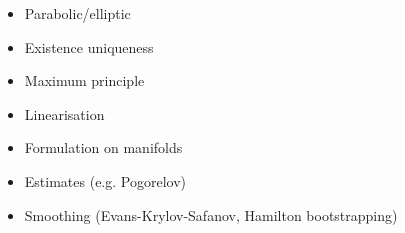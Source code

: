 \begin{itemize}
\item Parabolic/elliptic
\item Existence uniqueness
\item Maximum principle
\item Linearisation
\item Formulation on manifolds
\item Estimates (e.g. Pogorelov)
\item Smoothing (Evans-Krylov-Safanov, Hamilton bootstrapping)
\end{itemize}